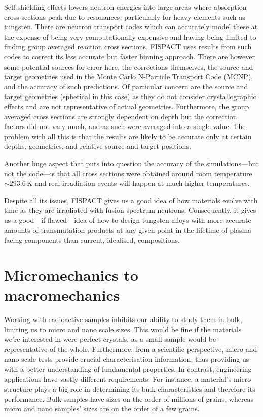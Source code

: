 \documentclass[12pt, a4paper]{article}
\begin{document}
		Self shielding effects lowers neutron energies into large areas where absorption cross sections peak due to resonances, particularly for heavy elements such as tungsten. There are neutron transport codes which can accurately model these at the expense of being very computationally expensive and having being limited to finding group averaged reaction cross sections. FISPACT uses results from such codes to correct its less accurate but faster binning approach. There are however some potential sources for error here, the corrections themselves, the source and target geometries used in the Monte Carlo N-Particle Transport Code (MCNP), and the accuracy of such predictions. Of particular concern are the source and target geometries (spherical in this case) as they do not consider crystallographic effects and are not representative of actual geometries. Furthermore, the group averaged cross sections are strongly dependent on depth but the correction factors did not vary much, and as such were averaged into a single value. The problem with all this is that the results are likely to be accurate only at certain depths, geometries, and relative source and target positions.
		
		Another huge aspect that puts into question the accuracy of the simulations---but not the code---is that all cross sections were obtained around room temperature $\sim 293.6\,\textrm{K}$ and real irradiation events will happen at much higher temperatures.
		
		Despite all its issues, FISPACT gives us a good idea of how materials evolve with time as they are irradiated with fusion spectrum neutrons. Consequently, it gives us a good---if flawed---idea of how to design tungsten alloys with more accurate amounts of transmutation products at any given point in the lifetime of plasma facing components than current, idealised, compositions.
	\section{Micromechanics to macromechanics}\label{s:mm}
		Working with radioactive samples inhibits our ability to study them in bulk, limiting us to micro and nano scale sizes. This would be fine if the materials we're interested in were perfect crystals, as a small sample would be representative of the whole. Furthermore, from a scientific perspective, micro and nano scale tests provide crucial characterisation information, thus providing us with a better understanding of fundamental properties. In contrast, engineering applications have vastly different requirements. For instance, a material's micro structure plays a big role in determining its bulk characteristics and therefore its performance. Bulk samples have sizes on the order of millions of grains, whereas micro and nano samples' sizes are on the order of a few grains.
		
\end{document}
